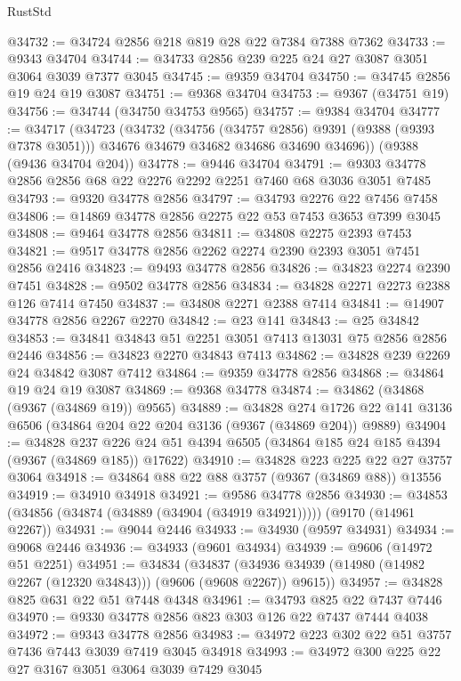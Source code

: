 \begin{lexlean}{RustStd}
\begin{coremodule}
@34732 := @34724 @2856 @218 @819 @28 @22 @7384 @7388 @7362
@34733 := @9343 @34704
@34744 := @34733 @2856 @239 @225 @24 @27 @3087 @3051 @3064 @3039 @7377 @3045
@34745 := @9359 @34704
@34750 := @34745 @2856 @19 @24 @19 @3087
@34751 := @9368 @34704
@34753 := @9367 (@34751 @19)
@34756 := @34744 (@34750 @34753 @9565)
@34757 := @9384 @34704
@34777 := @34717
    (@34723
      (@34732
        (@34756 (@34757 @2856) @9391 (@9388 (@9393 @7378 @3051)))
        @34676
        @34679
        @34682
        @34686
        @34690
        @34696))
    (@9388 (@9436 @34704 @204))
@34778 := @9446 @34704
@34791 := @9303 @34778 @2856 @2856 @68 @22 @2276 @2292 @2251 @7460 @68 @3036 @3051 @7485
@34793 := @9320 @34778 @2856
@34797 := @34793 @2276 @22 @7456 @7458
@34806 := @14869 @34778 @2856 @2275 @22 @53 @7453 @3653 @7399 @3045
@34808 := @9464 @34778 @2856
@34811 := @34808 @2275 @2393 @7453
@34821 := @9517 @34778 @2856 @2262 @2274 @2390 @2393 @3051 @7451 @2856 @2416
@34823 := @9493 @34778 @2856
@34826 := @34823 @2274 @2390 @7451
@34828 := @9502 @34778 @2856
@34834 := @34828 @2271 @2273 @2388 @126 @7414 @7450
@34837 := @34808 @2271 @2388 @7414
@34841 := @14907 @34778 @2856 @2267 @2270
@34842 := @23 @141
@34843 := @25 @34842
@34853 := @34841 @34843 @51 @2251 @3051 @7413 @13031 @75 @2856 @2856 @2446
@34856 := @34823 @2270 @34843 @7413
@34862 := @34828 @239 @2269 @24 @34842 @3087 @7412
@34864 := @9359 @34778 @2856
@34868 := @34864 @19 @24 @19 @3087
@34869 := @9368 @34778
@34874 := @34862 (@34868 (@9367 (@34869 @19)) @9565)
@34889 := @34828
    @274
    @1726
    @22
    @141
    @3136
    @6506
    (@34864 @204 @22 @204 @3136 (@9367 (@34869 @204)) @9889)
@34904 := @34828
    @237
    @226
    @24
    @51
    @4394
    @6505
    (@34864 @185 @24 @185 @4394 (@9367 (@34869 @185)) @17622)
@34910 := @34828 @223 @225 @22 @27 @3757 @3064
@34918 := @34864 @88 @22 @88 @3757 (@9367 (@34869 @88)) @13556
@34919 := @34910 @34918
@34921 := @9586 @34778 @2856
@34930 := @34853 (@34856 (@34874 (@34889 (@34904 (@34919 @34921))))) (@9170 (@14961 @2267))
@34931 := @9044 @2446
@34933 := @34930 (@9597 @34931)
@34934 := @9068 @2446
@34936 := @34933 (@9601 @34934)
@34939 := @9606 (@14972 @51 @2251)
@34951 := @34834
    (@34837 (@34936 @34939 (@14980 (@14982 @2267 (@12320 @34843))) (@9606 (@9608 @2267)) @9615))
@34957 := @34828 @825 @631 @22 @51 @7448 @4348
@34961 := @34793 @825 @22 @7437 @7446
@34970 := @9330 @34778 @2856 @823 @303 @126 @22 @7437 @7444 @4038
@34972 := @9343 @34778 @2856
@34983 := @34972 @223 @302 @22 @51 @3757 @7436 @7443 @3039 @7419 @3045 @34918
@34993 := @34972 @300 @225 @22 @27 @3167 @3051 @3064 @3039 @7429 @3045

\end{coremodule}
\end{lexlean}

